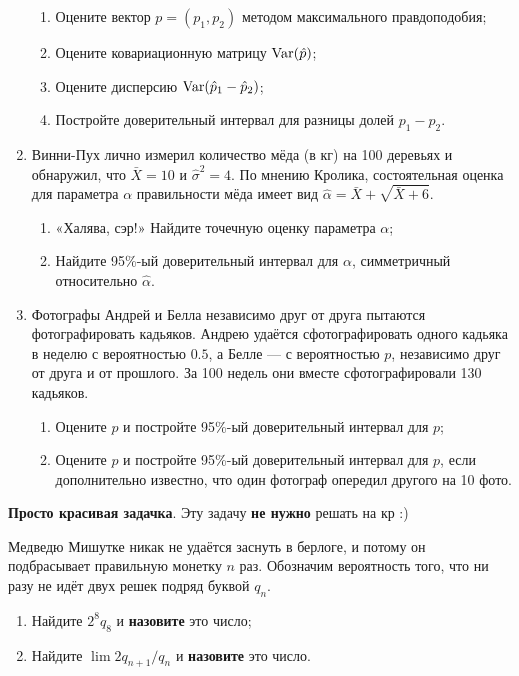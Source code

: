 \begin{enumerate}
      \begin{enumerate}
	\item Оцените вектор $p = (p_1, p_2)$ методом максимального правдоподобия;
	\item Оцените ковариационную матрицу $\operatorname{Var}(\hat p)$;
	\item Оцените дисперсию $\operatorname{Var}(\hat p_1 - \hat p_2)$;
	\item Постройте доверительный интервал для разницы долей $p_1 - p_2$.
      \end{enumerate}

  \item Винни-Пух лично измерил количество мёда (в кг) на 100 деревьях и обнаружил, что $\bar X = 10$ и $\hat\sigma^2 = 4$.
    По мнению Кролика, состоятельная оценка для параметра $\alpha$ правильности мёда имеет вид $\hat \alpha = \bar X + \sqrt{\bar X + 6}$.

    \begin{enumerate}
      \item «Халява, сэр!» Найдите точечную оценку параметра $\alpha$;
      \item Найдите 95\%-ый доверительный интервал для $\alpha$, симметричный относительно $\hat\alpha$.
    \end{enumerate}

  \item Фотографы Андрей и Белла независимо друг от друга пытаются фотографировать кадьяков.
    Андрею удаётся сфотографировать одного кадьяка в неделю с вероятностью $0.5$, а Белле — с вероятностью $p$,
    независимо друг от друга и от прошлого.
    За 100 недель они вместе сфотографировали 130 кадьяков.

    \begin{enumerate}
      \item Оцените $p$ и постройте 95\%-ый доверительный интервал для $p$;
      \item Оцените $p$ и постройте 95\%-ый доверительный интервал для $p$, если дополнительно известно, что один фотограф опередил другого на 10 фото.
    \end{enumerate}

\end{enumerate}


\textbf{Просто красивая задачка}. Эту задачу \textbf{не нужно} решать на кр :)

Медведю Мишутке никак не удаётся заснуть в берлоге, и потому он подбрасывает правильную монетку $n$ раз.
Обозначим вероятность того, что ни разу не идёт двух решек подряд буквой $q_n$.


        \begin{enumerate}[label=\asbuk*)]
	  \item Найдите $2^8q_8$ и \textbf{назовите} это число;
          \item Найдите $\lim 2q_{n+1}/q_n$ и \textbf{назовите} это число.
	\end{enumerate}

